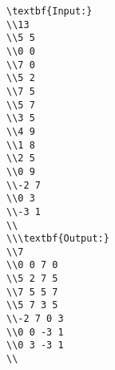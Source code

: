 \begin{verbatim}
\textbf{Input:}
\\13
\\5 5
\\0 0
\\7 0
\\5 2
\\7 5
\\5 7
\\3 5
\\4 9
\\1 8
\\2 5
\\0 9
\\-2 7
\\0 3
\\-3 1
\\
\\\textbf{Output:}
\\7
\\0 0 7 0
\\5 2 7 5
\\7 5 5 7
\\5 7 3 5
\\-2 7 0 3
\\0 0 -3 1
\\0 3 -3 1
\\\end{verbatim}